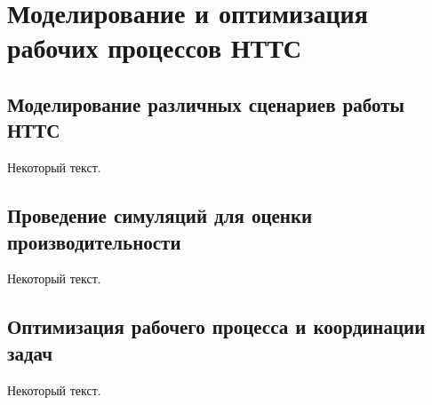 \chapter{Моделирование и оптимизация рабочих процессов НТТС}\label{ch:ch3}

\section{Моделирование различных сценариев работы НТТС}\label{sec:ch3/sec1}

Некоторый текст.

\section{Проведение симуляций для оценки производительности}\label{sec:ch3/sec2}

Некоторый текст.

\section{Оптимизация рабочего процесса и координации задач}\label{sec:ch3/sec3}

Некоторый текст.

\FloatBarrier